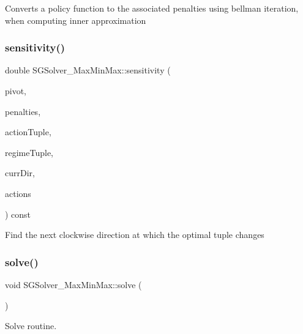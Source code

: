 Converts a policy function to the associated penalties using bellman iteration, when computing inner approximation \mbox{\label{classSGSolver__MaxMinMax_a98888e37855b47fca85583d4238933b3}} 
\subsubsection{\texorpdfstring{sensitivity()}{sensitivity()}}
{\footnotesize\ttfamily double S\+G\+Solver\+\_\+\+Max\+Min\+Max\+::sensitivity (\begin{DoxyParamCaption}\item[{const \hyperlink{classSGTuple}{S\+G\+Tuple} \&}]{pivot,  }\item[{const vector$<$ double $>$ \&}]{penalties,  }\item[{const vector$<$ S\+G\+Action\+Iter $>$ \&}]{action\+Tuple,  }\item[{const vector$<$ \hyperlink{namespaceSG_a139e4dec41ea0f38aae1f93f60cfff60}{S\+G\+::\+Regime} $>$ \&}]{regime\+Tuple,  }\item[{const \hyperlink{classSGPoint}{S\+G\+Point}}]{curr\+Dir,  }\item[{const vector$<$ list$<$ \hyperlink{classSGAction__MaxMinMax}{S\+G\+Action\+\_\+\+Max\+Min\+Max} $>$ $>$ \&}]{actions }\end{DoxyParamCaption}) const}

Find the next clockwise direction at which the optimal tuple changes \mbox{\label{classSGSolver__MaxMinMax_aad121e84c1492524e439ffba05893f3d}} 
\subsubsection{\texorpdfstring{solve()}{solve()}}
{\footnotesize\ttfamily void S\+G\+Solver\+\_\+\+Max\+Min\+Max\+::solve (\begin{DoxyParamCaption}{ }\end{DoxyParamCaption})}



Solve routine. 

